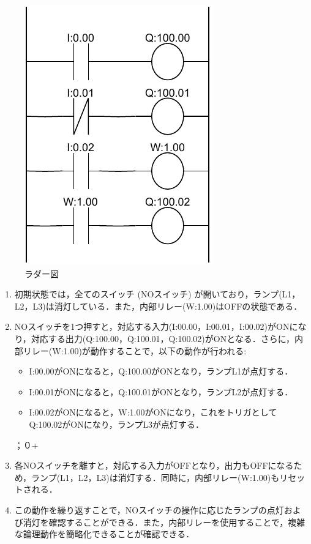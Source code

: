 \begin{figure}[H]
  \centering
  \includegraphics[scale=0.7]{sozai/21.pdf}
  \caption{ラダー図}
\end{figure}

\begin{enumerate}
  \item 初期状態では，全てのスイッチ (NOスイッチ) が開いており，ランプ(L1，L2，L3)は消灯している．また，内部リレー(W:1.00)はOFFの状態である．
  \item NOスイッチを1つ押すと，対応する入力(I:00.00，I:00.01，I:00.02)がONになり，対応する出力(Q:100.00，Q:100.01，Q:100.02)がONとなる．さらに，内部リレー(W:1.00)が動作することで，以下の動作が行われる:
  \begin{itemize}
      \item I:00.00がONになると，Q:100.00がONとなり，ランプL1が点灯する．
      \item I:00.01がONになると，Q:100.01がONとなり，ランプL2が点灯する．
      \item I:00.02がONになると，W:1.00がONになり，これをトリガとしてQ:100.02がONになり，ランプL3が点灯する．
  \end{itemize}；０+
  \item 各NOスイッチを離すと，対応する入力がOFFとなり，出力もOFFになるため，ランプ(L1，L2，L3)は消灯する．同時に，内部リレー(W:1.00)もリセットされる．
  \item この動作を繰り返すことで，NOスイッチの操作に応じたランプの点灯および消灯を確認することができる．また，内部リレーを使用することで，複雑な論理動作を簡略化できることが確認できる．
\end{enumerate}


